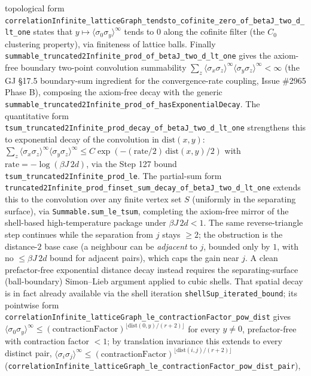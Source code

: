 \documentclass[a4paper,11pt]{article}
\begin{document}
topological form
\texttt{correlationInfinite\_latticeGraph\_tendsto\_cofinite\_zero\_of\_betaJ\_two\_d\_lt\_one}
states that \(y\mapsto\langle\sigma_0\sigma_y\rangle^\infty\) tends to \(0\) along the
cofinite filter (the \(C_0\) clustering property), via finiteness of lattice balls.
Finally \texttt{summable\_truncated2Infinite\_prod\_of\_betaJ\_two\_d\_lt\_one} gives the
axiom-free boundary two-point convolution summability
\(\sum_z\langle\sigma_x\sigma_z\rangle^\infty\langle\sigma_y\sigma_z\rangle^\infty<\infty\)
(the GJ §17.5 boundary-sum ingredient for the convergence-rate coupling, Issue \#2965
Phase B), composing the axiom-free decay with the generic
\texttt{summable\_truncated2Infinite\_prod\_of\_hasExponentialDecay}.  The quantitative form
\texttt{tsum\_truncated2Infinite\_prod\_decay\_of\_betaJ\_two\_d\_lt\_one} strengthens this to
exponential decay of the convolution in \(\mathrm{dist}(x,y)\):
\(\sum_z\langle\sigma_x\sigma_z\rangle^\infty\langle\sigma_y\sigma_z\rangle^\infty
\le C\exp(-(\mathrm{rate}/2)\,\mathrm{dist}(x,y)/2)\) with
\(\mathrm{rate}=-\log(\beta J\,2d)\), via the Step 127 bound
\texttt{tsum\_truncated2Infinite\_prod\_le}.  The partial-sum form
\texttt{truncated2Infinite\_prod\_finset\_sum\_decay\_of\_betaJ\_two\_d\_lt\_one} extends this
to the convolution over any finite vertex set \(S\) (uniformly in the separating surface),
via \texttt{Summable.sum\_le\_tsum}, completing the axiom-free mirror of the shell-based
high-temperature package under \(\beta J\,2d<1\).
The same reverse-triangle step continues while the separation from \(j\) stays \(\ge2\);
the obstruction is the
distance-\(2\) base case (a neighbour can be \emph{adjacent} to \(j\), bounded only by
\(1\), with no \(\le\beta J\,2d\) bound for adjacent pairs), which caps the gain near
\(j\).  A clean prefactor-free
exponential distance decay instead requires the separating-surface
(ball-boundary) Simon--Lieb argument applied to cubic shells.  That spatial decay
is in fact already available via the shell iteration
\texttt{shellSup\_iterated\_bound}; its pointwise form
\texttt{correlationInfinite\_latticeGraph\_le\_contractionFactor\_pow\_dist} gives
\(\langle\sigma_0\sigma_y\rangle^\infty\le(\text{contractionFactor})^{\lfloor\mathrm{dist}(0,y)/(r+2)\rfloor}\)
for every \(y\neq0\), prefactor-free with contraction factor \(<1\); by
translation invariance this extends to every distinct pair,
\(\langle\sigma_i\sigma_j\rangle^\infty\le(\text{contractionFactor})^{\lfloor\mathrm{dist}(i,j)/(r+2)\rfloor}\)
(\texttt{correlationInfinite\_latticeGraph\_le\_contractionFactor\_pow\_dist\_pair}),
\end{document}
